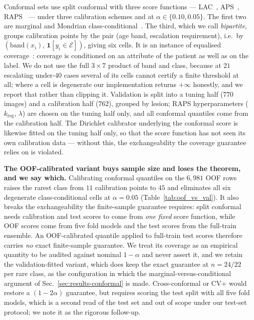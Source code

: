 \documentclass[journal]{IEEEtran}
\begin{document}
Conformal sets use split conformal with three score functions --- LAC~\cite{sadinle2019lac},
APS~\cite{romano2020aps}, RAPS~\cite{angelopoulos2021raps} --- under three calibration
schemes and at $\alpha \in \{0.10, 0.05\}$. The first two are marginal and Mondrian
class-conditional~\cite{vovk2012conditional}. The third, which we call \emph{bipartite},
groups calibration points by the pair (age band, escalation requirement), i.e.\ by
$(\mathrm{band}(x_i),\, \mathbf{1}[y_i \in \mathcal{E}])$, giving six cells. It is an instance
of equalised coverage~\cite{romano2020equalized}: coverage is conditioned on an attribute of
the patient as well as on the label. We do not use the full $3 \times 7$ product of band and
class, because at $21$ escalating under-$40$ cases several of its cells cannot certify a
finite threshold at all; where a cell is degenerate our implementation returns $+\infty$
honestly, and we report that rather than clipping it. Validation is split into a tuning half ($770$ images) and a calibration
half ($762$), grouped by lesion; RAPS hyperparameters ($k_{\mathrm{reg}}$, $\lambda$) are
chosen on the tuning half only, and all conformal quantiles come from the calibration half.
The Dirichlet calibrator underlying the conformal score is likewise fitted on the tuning half
only, so that the score function has not seen its own calibration data --- without this, the
exchangeability the coverage guarantee relies on is violated.

\textbf{The OOF-calibrated variant buys sample size and loses the theorem, and we say which.}
Calibrating conformal quantiles on the $6{,}981$ OOF rows raises the rarest class from $11$
calibration points to $45$ and eliminates all six degenerate class-conditional cells at
$\alpha=0.05$ (Table~\ref{tab:oof_vs_val}). It also breaks the exchangeability the
finite-sample guarantee requires: split conformal needs calibration and test scores to come
from \emph{one fixed} score function, while OOF scores come from five fold models and the
test scores from the full-train ensemble. An OOF-calibrated quantile applied to full-train
test scores therefore carries \emph{no} exact finite-sample guarantee. We treat its coverage
as an empirical quantity to be audited against nominal $1-\alpha$ and never assert it, and we
retain the validation-fitted variant, which does keep the exact guarantee at $n=24/22$ per
rare class, as the configuration in which the marginal-versus-conditional argument of
Sec.~\ref{sec:results-conformal} is made. Cross-conformal or CV+ would restore a
$(1-2\alpha)$ guarantee, but requires scoring the test split with all five fold models, which
is a second read of the test set and out of scope under our test-set protocol; we note it as
the rigorous follow-up.
\end{document}
